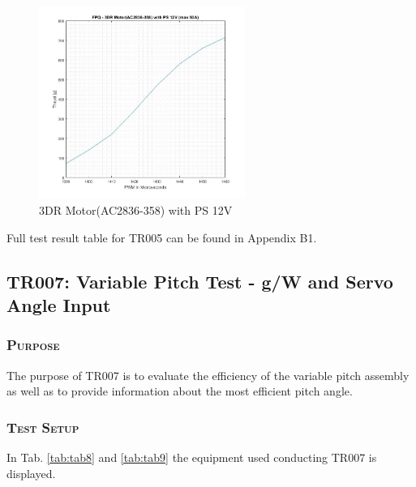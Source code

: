 \begin{figure}[H]
    \centering
    \includegraphics[width = 0.6\textwidth]{VAPIQ-PICTURES/FPQ1}
    \caption{3DR Motor(AC2836-358) with PS 12V}
    \label{fig:fpq1}
\end{figure}

Full test result table for TR005 can be found in Appendix B1.
        
\newpage

\subsection{TR007: Variable Pitch Test - g/W and Servo Angle Input}
         {}


\subsubsection*{\textsc{\medium Purpose}}
The purpose of TR007 is to evaluate the efficiency of the variable pitch assembly as well as to provide information about the most efficient pitch angle. 

\subsubsection*{\textsc{\medium Test Setup}}
In Tab. \ref{tab:tab8} and \ref{tab:tab9} the equipment used conducting TR007 is displayed. 

